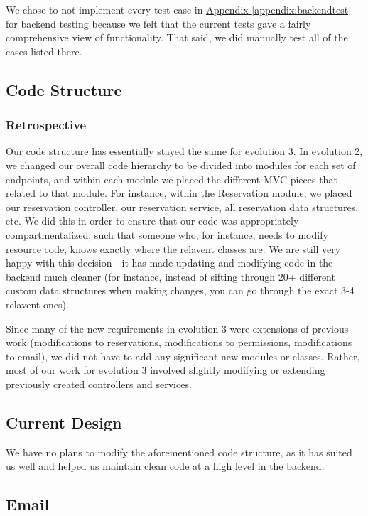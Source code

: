 \documentclass[12pt]{article}
\begin{document}
We chose to not implement every test case in \hyperref[appendix:backendtest]{Appendix \ref{appendix:backendtest}} for backend testing because we felt that the current tests gave a fairly comprehensive view of functionality. That said, we did manually test all of the cases listed there.


\subsection{Code Structure}
\subsubsection{Retrospective}
Our code structure has essentially stayed the same for evolution 3. In evolution 2, we changed our overall code hierarchy to be divided into modules for each set of endpoints, and within each module we placed the different MVC pieces that related to that module. For instance, within the Reservation module, we placed our reservation controller, our reservation service, all reservation data structures, etc. We did this in order to ensure that our code was appropriately compartmentalized, such that someone who, for instance, needs to modify resource code, knows exactly where the relavent classes are. We are still very happy with this decision - it has made updating and modifying code in the backend much cleaner (for instance, instead of sifting through 20+ different custom data structures when making changes, you can go through the exact 3-4 relavent ones). 

Since many of the new requirements in evolution 3 were extensions of previous work (modifications to reservations, modifications to permissions, modifications to email), we did not have to add any significant new modules or classes. Rather, most of our work for evolution 3 involved slightly modifying or extending previously created controllers and services. 

\subsection{Current Design}
We have no plans to modify the aforementioned code structure, as it has suited us well and helped us maintain clean code at a high level in the backend. 


\subsection{Email}
\label{sec:EMAIL}
\end{document}
